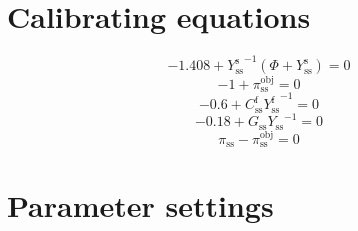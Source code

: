 \section{Calibrating equations}

\begin{equation}
-1.408 + {Y^{\mathrm{s}}_\mathrm{ss}}^{-1} \left(\Phi + Y^{\mathrm{s}}_\mathrm{ss}\right) = 0
\end{equation}
\begin{equation}
-1 + \pi^{\mathrm{obj}}_\mathrm{ss} = 0
\end{equation}
\begin{equation}
-0.6 + {C^{\mathrm{f}}_\mathrm{ss}} {Y^{\mathrm{f}}_\mathrm{ss}}^{-1} = 0
\end{equation}
\begin{equation}
-0.18 + {G_\mathrm{ss}} {Y_\mathrm{ss}}^{-1} = 0
\end{equation}
\begin{equation}
\pi_\mathrm{ss} - \pi^{\mathrm{obj}}_\mathrm{ss} = 0
\end{equation}



\section{Parameter settings}

